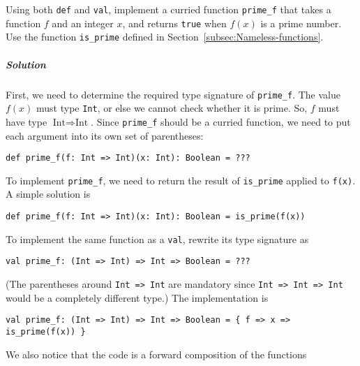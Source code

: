 Using both \lstinline!def!
and \lstinline!val!, implement
a curried function \lstinline!prime_f!
that takes a function $f$ and an integer $x$, and returns \lstinline!true!
when $f(x)$ is a prime number. Use the function \lstinline!is_prime!
defined in Section~\ref{subsec:Nameless-functions}. 

\subparagraph{Solution}

First, we need to determine the required type signature of \lstinline!prime_f!.
The value $f(x)$ must type \lstinline!Int!,
or else we cannot check whether it is prime. So, $f$ must have type
$\text{Int}\Rightarrow\text{Int}$. Since \lstinline!prime_f!
should be a curried function, we need to put each argument into its
own set of parentheses:
\begin{lstlisting}
def prime_f(f: Int => Int)(x: Int): Boolean = ???
\end{lstlisting}
To implement \lstinline!prime_f!,
we need to return the result of \lstinline!is_prime!
applied to \lstinline!f(x)!.
A simple solution is
\begin{lstlisting}
def prime_f(f: Int => Int)(x: Int): Boolean = is_prime(f(x))
\end{lstlisting}
To implement the same function as a \lstinline!val!,
rewrite its type signature as
\begin{lstlisting}
val prime_f: (Int => Int) => Int => Boolean = ???
\end{lstlisting}
(The parentheses around \lstinline!Int => Int!
are mandatory since \lstinline!Int => Int => Int!
would be a completely different type.) The implementation is
\begin{lstlisting}
val prime_f: (Int => Int) => Int => Boolean = { f => x => is_prime(f(x)) }
\end{lstlisting}
We also notice that the code is a forward composition of the functions
